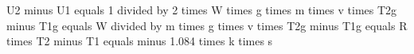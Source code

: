 U2 minus U1 equals 1 divided by 2 times W times g times m times v times T2g minus T1g equals W divided by m times g times v times T2g minus T1g equals R times T2 minus T1 equals minus 1.084 times k times s